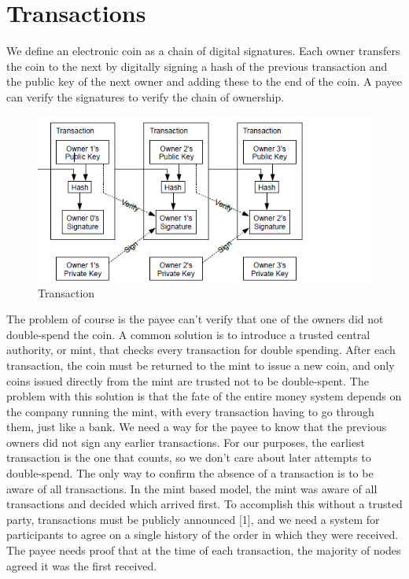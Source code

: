 \section{Transactions}

We define an electronic coin as a chain of digital signatures. Each owner transfers the coin to the
next by digitally signing a hash of the previous transaction and the public key of the next owner
and adding these to the end of the coin. A payee can verify the signatures to verify the chain of
ownership.

\begin{figure}[ht!]
\centering
\includegraphics[trim = 0mm 0mm 30mm 0mm, width=120mm]{images/transaction}
\caption{Transaction}
\end{figure}

The problem of course is the payee can't verify that one of the owners did not double-spend
the coin. A common solution is to introduce a trusted central authority, or mint, that checks every
transaction for double spending. After each transaction, the coin must be returned to the mint to
issue a new coin, and only coins issued directly from the mint are trusted not to be double-spent.
The problem with this solution is that the fate of the entire money system depends on the
company running the mint, with every transaction having to go through them, just like a bank.
We need a way for the payee to know that the previous owners did not sign any earlier
transactions. For our purposes, the earliest transaction is the one that counts, so we don't care
about later attempts to double-spend. The only way to confirm the absence of a transaction is to
be aware of all transactions. In the mint based model, the mint was aware of all transactions and
decided which arrived first. To accomplish this without a trusted party, transactions must be
publicly announced [1], and we need a system for participants to agree on a single history of the
order in which they were received. The payee needs proof that at the time of each transaction, the
majority of nodes agreed it was the first received.

